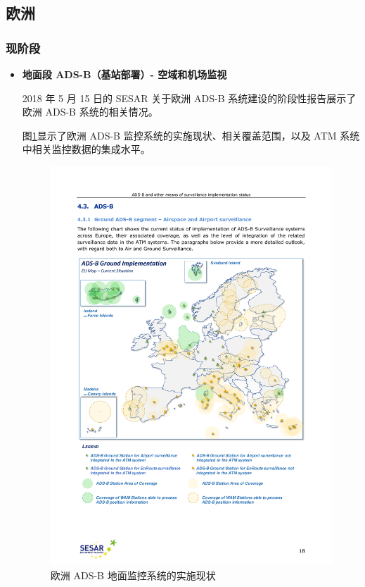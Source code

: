 \subsection{欧洲}

\subsubsection{现阶段}

\begin{itemize}

    \item \textbf{地面段 ADS-B（基站部署）- 空域和机场监视}

    2018 年 5 月 15 日的 SESAR 关于欧洲 ADS-B 系统建设的阶段性报告展示了欧洲 ADS-B 系统的相关情况。

    图\ref{fig:20180515-sesar-ads-b-report_18}显示了欧洲 ADS-B 监控系统的实施现状、相关覆盖范围，以及 \acs{ATM} 系统中相关监控数据的集成水平。

    \begin{figure}[!htb]
    \centering
    \includegraphics[width=14cm]{pic/20180515-sesar-ads-b-report_18.pdf}
    \caption{欧洲 ADS-B 地面监控系统的实施现状\protect\footnotemark}
    \label{fig:20180515-sesar-ads-b-report_18}
    \end{figure}


\end{itemize}

